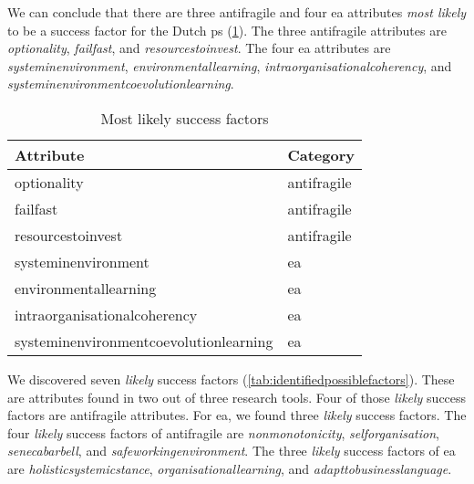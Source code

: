 We can conclude that there are three \gls{antifragile} and four \gls{ea} \glspl{attribute} \textit{most likely} to be a success factor for the Dutch \gls{ps} (\cref{tab:identifiedsuccessfactors}). The three \gls{antifragile} \glspl{attribute} are \textit{\gls{optionality}}, \textit{\gls{failfast}}, and \textit{\gls{resourcestoinvest}}. The four \gls{ea} \glspl{attribute} are \textit{\gls{systeminenvironment}}, \textit{\gls{environmentallearning}}, \textit{\gls{intraorganisationalcoherency}}, and \textit{\gls{systeminenvironmentcoevolutionlearning}}.

\begin{table}[H]
	\centering
	\begin{tabular}{@{}ll@{}}
		\toprule
	\textbf{Attribute} & \textbf{Category} \\%
		\midrule
		\Gls{optionality} & \Gls{antifragile} \\%
		\Gls{failfast} & \Gls{antifragile} \\%
		\Gls{resourcestoinvest} & \Gls{antifragile} \\%
		\Gls{systeminenvironment} & \gls{ea} \\%
		\Gls{environmentallearning} & \gls{ea} \\%
		\Gls{intraorganisationalcoherency} & \gls{ea} \\%
		\Gls{systeminenvironmentcoevolutionlearning} & \gls{ea} \\%
		\bottomrule
	\end{tabular}%
	\caption[Most likely success factors]{Most likely success factors}
	\label{tab:identifiedsuccessfactors}%
\end{table}%
We discovered seven \textit{likely} success factors (\cref{tab:identifiedpossiblefactors}). These are \glspl{attribute} found in two out of three research tools. Four of those \textit{likely} success factors are \gls{antifragile} \glspl{attribute}. For \gls{ea}, we found three \textit{likely} success factors. The four \textit{likely} success factors of \gls{antifragile} are \textit{\gls{nonmonotonicity}}, \textit{\gls{selforganisation}}, \textit{\gls{senecabarbell}}, and \textit{\gls{safeworkingenvironment}}. The three \textit{likely} success factors of \gls{ea} are \textit{\gls{holisticsystemicstance}}, \textit{\gls{organisationallearning}}, and \textit{\gls{adapttobusinesslanguage}}.

